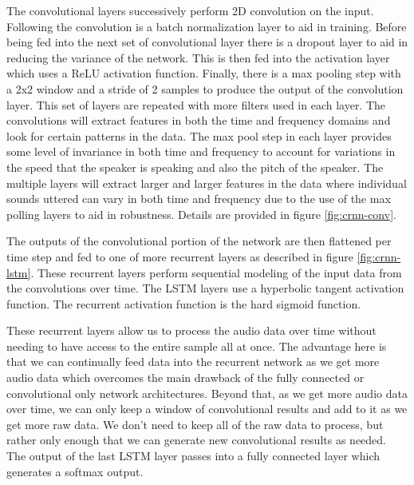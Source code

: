 \documentclass{article}
\begin{document}
The convolutional layers successively perform 2D convolution on the
input. Following the convolution is a batch normalization layer to aid
in training. Before being fed into the next set of convolutional layer
there is a dropout layer to aid in reducing the variance of the
network. This is then fed into the activation layer which uses a
ReLU activation function. Finally, there is a max pooling step with a
2x2 window and a stride of 2 samples to produce the output of the
convolution layer. This set of layers are repeated with more filters
used in each layer. The convolutions will extract features in both the
time and frequency domains and look for certain patterns in the
data. The max pool step in each layer provides some level of
invariance in both time and frequency to account for variations in the
speed that the speaker is speaking and also the pitch of the
speaker. The multiple layers will extract larger and larger features
in the data where individual sounds uttered can vary in both time and
frequency due to the use of the max polling layers to aid in
robustness. Details are provided in figure \ref{fig:crnn-conv}.

The outputs of the convolutional portion of the network are then
flattened per time step and fed to one of more recurrent layers as
described in figure \ref{fig:crnn-lstm}. These
recurrent layers perform sequential modeling of the input data from
the convolutions over time. The LSTM layers use a hyperbolic tangent
activation function. The recurrent activation function is the hard
sigmoid function.

These recurrent layers allow us to process
the audio data over time without needing to have access to the entire
sample all at once. The advantage here is that we can continually feed
data into the recurrent network as we get more audio data which
overcomes the main drawback of the fully connected or convolutional
only network architectures. Beyond that, as we get more audio data
over time, we can only keep a window of convolutional results and add
to it as we get more raw data. We don't need to keep all of the raw
data to process, but rather only enough that we can generate new
convolutional results as needed. The output of the last LSTM layer
passes into a fully connected layer which generates a softmax output.
\end{document}
